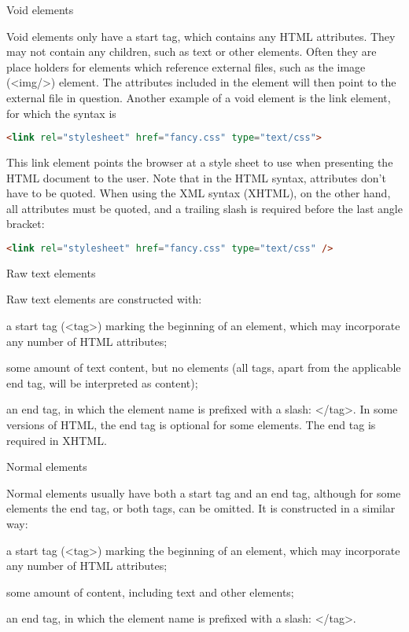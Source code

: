\begin{compactenum}
\item Void elements

Void elements only have a start tag, which contains any HTML attributes. They may not contain any children, such as text or other elements. Often they are place holders for elements which reference external files, such as the image (<img/>) element. The attributes included in the element will then point to the external file in question. Another example of a void element is the link element, for which the syntax is

\begin{lstlisting}[language=HTML]
<link rel="stylesheet" href="fancy.css" type="text/css">
\end{lstlisting}

This link element points the browser at a style sheet to use when presenting the HTML document to the user. Note that in the HTML syntax, attributes don't have to be quoted. When using the XML syntax (XHTML), on the other hand, all attributes must be quoted, and a trailing slash is required before the last angle bracket:


\begin{lstlisting}[language=HTML]
<link rel="stylesheet" href="fancy.css" type="text/css" />
\end{lstlisting}


\item Raw text elements

Raw text elements are constructed with:

\begin{compactitem}
\item a start tag (<tag>) marking the beginning of an element, which may incorporate any number of HTML attributes;
\item some amount of text content, but no elements (all tags, apart from the applicable end tag, will be interpreted as content);
\item an end tag, in which the element name is prefixed with a slash: </tag>. In some versions of HTML, the end tag is optional for some elements. The end tag is required in XHTML.
\end{compactitem}

\item Normal elements

Normal elements usually have both a start tag and an end tag, although for some elements the end tag, or both tags, can be omitted. It is constructed in a similar way:

\begin{compactitem}
\item a start tag (<tag>) marking the beginning of an element, which may incorporate any number of HTML attributes;
\item some amount of content, including text and other elements;
\item an end tag, in which the element name is prefixed with a slash: </tag>.
\end{compactitem}

\end{compactenum}


